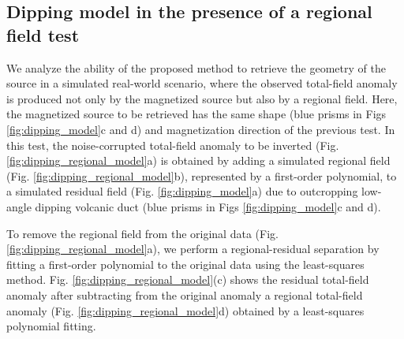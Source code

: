 \subsection{Dipping model in the presence of a regional field test}

We analyze the ability of the proposed method to retrieve the geometry of the source
in a simulated real-world scenario, where the observed total-field anomaly is produced not only by 
the magnetized source but also by a regional field. 
Here, the magnetized source to be retrieved has the same shape (blue prisms in Figs \ref{fig:dipping_model}c and d) and magnetization direction of the previous test. 
In this test, the noise-corrupted total-field anomaly to be inverted 
(Fig. \ref{fig:dipping_regional_model}a) is obtained by adding 
a simulated regional field (Fig. \ref{fig:dipping_regional_model}b), 
represented by a first-order polynomial, 
to a simulated residual field (Fig. \ref{fig:dipping_model}a) due to outcropping low-angle dipping volcanic duct (blue prisms in Figs \ref{fig:dipping_model}c and d). 

To remove the regional field from the original data (Fig. \ref{fig:dipping_regional_model}a),
we perform a regional-residual separation by fitting a first-order polynomial 
to the original data using the least-squares method.
Fig. \ref{fig:dipping_regional_model}(c) shows the residual total-field anomaly after subtracting from the original anomaly a regional total-field anomaly 
(Fig. \ref{fig:dipping_regional_model}d) obtained by a least-squares polynomial fitting. 

